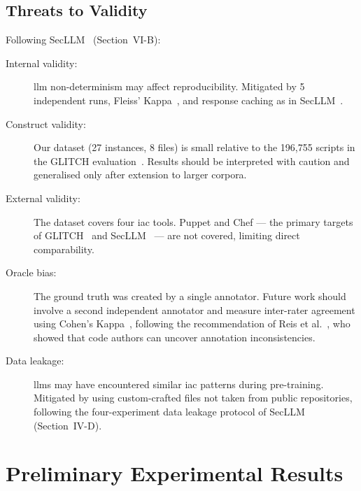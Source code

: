 \documentclass[12pt, a4paper]{report}
\begin{document}
\section{Threats to Validity}

Following SecLLM~\citep{devito2025secllm} (Section~VI-B):

\begin{description}
  \item[Internal validity:] \gls{llm} non-determinism may affect reproducibility.
  Mitigated by 5 independent runs, Fleiss' Kappa~\citep{fleiss2013statistical},
  and response caching as in SecLLM~\citep{devito2025secllm}.

  \item[Construct validity:] Our dataset (27 instances, 8 files) is small relative to
  the 196,755 scripts in the GLITCH evaluation~\citep{saavedra2022glitch}.
  Results should be interpreted with caution and generalised only after extension
  to larger corpora.

  \item[External validity:] The dataset covers four \gls{iac} tools. Puppet and Chef
  --- the primary targets of GLITCH~\citep{saavedra2022glitch} and SecLLM~\citep{devito2025secllm}
  --- are not covered, limiting direct comparability.

  \item[Oracle bias:] The ground truth was created by a single annotator. Future work
  should involve a second independent annotator and measure inter-rater agreement
  using Cohen's Kappa~\citep{cohen1960kappa}, following the recommendation of
  Reis et al.~\citep{reis2022leveraging}, who showed that code authors can uncover
  annotation inconsistencies.

  \item[Data leakage:] \gls{llm}s may have encountered similar \gls{iac} patterns
  during pre-training. Mitigated by using custom-crafted files not taken from
  public repositories, following the four-experiment data leakage protocol of
  SecLLM~\citep{devito2025secllm} (Section~IV-D).
\end{description}

\chapter{Preliminary Experimental Results}
\label{chap:results}
\end{document}
